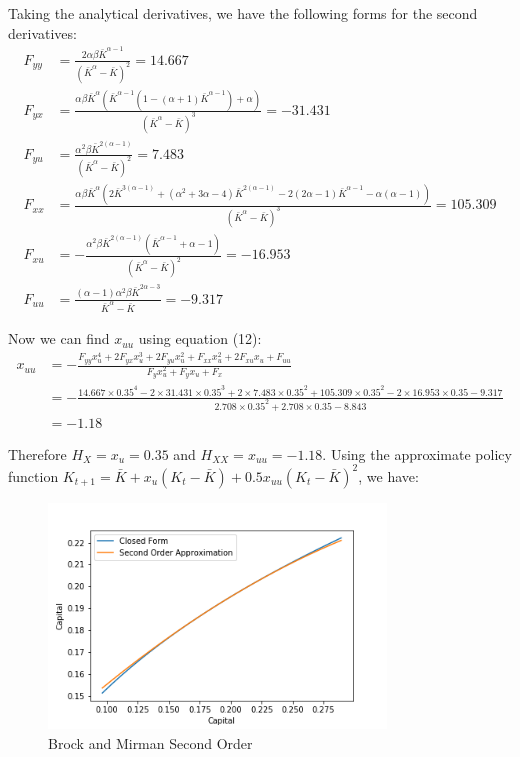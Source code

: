 \documentclass[letterpaper,11pt]{article}
\theoremstyle{definition}
\begin{document}
\begin{spacing}{1.5}
\begin{Exercise}
		Taking the analytical derivatives, we have the following forms for the second derivatives:
		\begin{align*}
			F_{yy} &= \frac{2\alpha\beta\bar{K}^{\alpha-1}}{(\bar{K}^\alpha-\bar{K})^2} = 14.667\\
			F_{yx} &= \frac{\alpha\beta\bar{K}^\alpha(\bar{K}^{\alpha-1}(1-(\alpha+1)\bar{K}^{\alpha-1})+\alpha)}{(\bar{K}^\alpha-\bar{K})^3}=-31.431 \\
			F_{yu} &= \frac{\alpha^2\beta\bar{K}^{2(\alpha-1)}}{(\bar{K}^\alpha-\bar{K})^2} =7.483 \\
			F_{xx} &= \frac{\alpha\beta\bar{K}^\alpha(2\bar{K}^{3(\alpha-1)}+(\alpha^2+3\alpha-4)\bar{K}^{2(\alpha-1)}-2(2\alpha-1)\bar{K}^{\alpha-1}-\alpha(\alpha-1))}{(\bar{K}^\alpha-\bar{K})^3} = 105.309\\
			F_{xu} &=  -\frac{\alpha^2\beta\bar{K}^{2(\alpha-1)}(\bar{K}^{\alpha-1}+\alpha-1)}{(\bar{K}^\alpha-\bar{K})^2} = -16.953\\
			F_{uu} &= \frac{(\alpha-1)\alpha^2\beta\bar{K}^{2\alpha-3}}{\bar{K}^\alpha-\bar{K}} = -9.317
		\end{align*}

		Now we can find $x_{uu}$ using equation (12):
		\begin{align*}
			x_{uu} &=-\frac{F_{yy}x_u^4+2F_{yx}x_u^3+2F_{yu}x_u^2+F_{xx}x_u^2+2F_{xu}x_u+F_{uu}}{F_yx_u^2+F_yx_u+F_x} \\
			&= -\frac{14.667\times 0.35^4-2\times 31.431\times 0.35^3+2\times 7.483\times 0.35^2+105.309\times 0.35^2-2\times 16.953\times 0.35-9.317}{2.708\times 0.35^2+ 2.708\times 0.35-8.843} \\
			&= -1.18
		\end{align*}

		Therefore $H_X = x_u = 0.35$ and $H_{XX} = x_{uu} = -1.18$. Using the approximate policy function $K_{t+1}=\bar{K}+x_u(K_t-\bar{K})+0.5x_{uu}(K_t-\bar{K})^2$, we have:

		\begin{figure}[H]
			\caption{Brock and Mirman Second Order}
			\label{fig:BM_second}
			\includegraphics[width=0.8\textwidth]{BM_secondorder.png}
		\end{figure}
	\end{Exercise}


\end{spacing}
\end{document}
